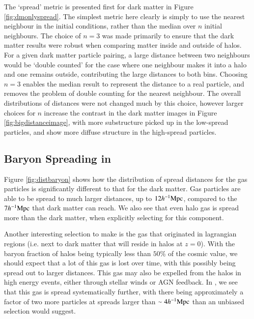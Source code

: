 The `spread' metric is presented first for dark matter in Figure
\ref{fig:dmonlyspread}. The simplest metric here clearly is simply to use the
nearest neighbour in the initial conditions, rather than the median over $n$
initial neighbours. The choice of $n=3$ was made primarily to ensure that the
dark matter results were robust when comparing matter inside and outside of
halos. For a given dark matter particle pairing, a large distance between two
neighbours would be `double counted' for the case where one neighbour makes
it into a halo and one remains outside, contributing the large distances to
both bins. Choosing $n=3$ enables the median result to represent the distance
to a real particle, and removes the problem of double counting for the
nearest neighbour. The overall distributions of distances were not changed
much by this choice, however larger choices for $n$ increase the contrast in
the dark matter images in Figure \ref{fig:bigdistanceimage}, with more
substructure picked up in the low-spread particles, and show more diffuse
structure in the high-spread particles.

\subsection{Baryon Spreading in \simba{}}

Figure \ref{fig:distbaryon} shows how the distribution of spread distances
for the gas particles is significantly different to that for the dark matter.
Gas particles are able to be spread to much larger distances, up to $12h^{-1}{\rm Mpc}{}$,
compared to the $7h^{-1}{\rm Mpc}{}$ that dark matter can reach. We also see that even
halo gas is spread more than the dark matter, when explicitly selecting for this
component.

Another interesting selection to make is the gas that originated in
lagrangian regions (i.e. next to dark matter that will reside in halos at
$z=0$). With the baryon fraction of halos being typically less than $50\%$ of
the cosmic value, we should expect that a lot of this gas is lost over time,
with this possibly being spread out to larger distances. This gas may also be
expelled from the halos in high energy events, either through stellar winds
or AGN feedback. In \simba{}, we see that this gas is spread systematically
further, with there being approximately a factor of two more particles at
spreads larger than $\sim 4 h^{-1}{\rm Mpc}{}$ than an unbiased selection would
suggest.

